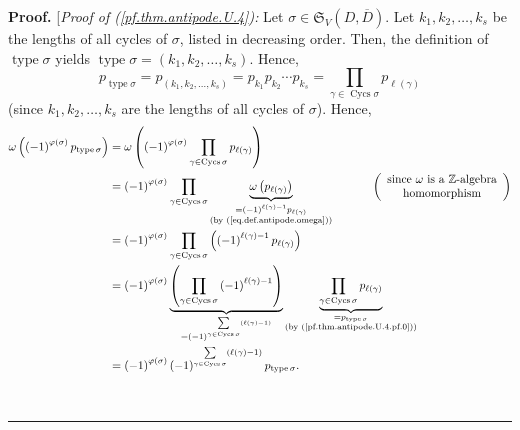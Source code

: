 \documentclass[numbers=enddot,12pt,final,onecolumn,notitlepage]{scrartcl}%
\numberwithin{exer}{section}
\theoremstyle{definition}
\newenvironment{proof}[1][Proof]{\noindent\textbf{#1.} }{\ \rule{0.5em}{0.5em}}
\let\sumnonlimits\sum
\let\prodnonlimits\prod
\renewcommand{\sum}{\sumnonlimits\limits}
\renewcommand{\prod}{\prodnonlimits\limits}
\begin{document}
\begin{proof}
[\textit{Proof of (\ref{pf.thm.antipode.U.4}):} Let $\sigma\in\mathfrak{S}%
_{V}\left(  D,\overline{D}\right)  $. Let $k_{1},k_{2},\ldots,k_{s}$ be the
lengths of all cycles of $\sigma$, listed in decreasing order. Then, the
definition of $\operatorname*{type}\sigma$ yields $\operatorname*{type}%
\sigma=\left(  k_{1},k_{2},\ldots,k_{s}\right)  $. Hence,
\begin{equation}
p_{\operatorname*{type}\sigma}=p_{\left(  k_{1},k_{2},\ldots,k_{s}\right)
}=p_{k_{1}}p_{k_{2}}\cdots p_{k_{s}}=\prod_{\gamma\in\operatorname*{Cycs}%
\sigma}p_{\ell\left(  \gamma\right)  } \label{pf.thm.antipode.U.4.pf.0}%
\end{equation}
(since $k_{1},k_{2},\ldots,k_{s}$ are the lengths of all cycles of $\sigma$).
Hence,%
\begin{align}
\omega\left(  \left(  -1\right)  ^{\varphi\left(  \sigma\right)
}p_{\operatorname*{type}\sigma}\right)   &  =\omega\left(  \left(  -1\right)
^{\varphi\left(  \sigma\right)  }\prod_{\gamma\in\operatorname*{Cycs}\sigma
}p_{\ell\left(  \gamma\right)  }\right) \nonumber\\
&  =\left(  -1\right)  ^{\varphi\left(  \sigma\right)  }\prod_{\gamma
\in\operatorname*{Cycs}\sigma}\underbrace{\omega\left(  p_{\ell\left(
\gamma\right)  }\right)  }_{\substack{=\left(  -1\right)  ^{\ell\left(
\gamma\right)  -1}p_{\ell\left(  \gamma\right)  }\\\text{(by
(\ref{eq.def.antipode.omega}))}}}\ \ \ \ \ \ \ \ \ \ \left(
\begin{array}
[c]{c}%
\text{since }\omega\text{ is a }\mathbb{Z}\text{-algebra}\\
\text{homomorphism}%
\end{array}
\right) \nonumber\\
&  =\left(  -1\right)  ^{\varphi\left(  \sigma\right)  }\prod_{\gamma
\in\operatorname*{Cycs}\sigma}\left(  \left(  -1\right)  ^{\ell\left(
\gamma\right)  -1}p_{\ell\left(  \gamma\right)  }\right) \nonumber\\
&  =\left(  -1\right)  ^{\varphi\left(  \sigma\right)  }\underbrace{\left(
\prod_{\gamma\in\operatorname*{Cycs}\sigma}\left(  -1\right)  ^{\ell\left(
\gamma\right)  -1}\right)  }_{=\left(  -1\right)  ^{\sum_{\gamma
\in\operatorname*{Cycs}\sigma}\left(  \ell\left(  \gamma\right)  -1\right)  }%
}\underbrace{\prod_{\gamma\in\operatorname*{Cycs}\sigma}p_{\ell\left(
\gamma\right)  }}_{\substack{=p_{\operatorname*{type}\sigma}\\\text{(by
(\ref{pf.thm.antipode.U.4.pf.0}))}}}\nonumber\\
&  =\left(  -1\right)  ^{\varphi\left(  \sigma\right)  }\left(  -1\right)
^{\sum_{\gamma\in\operatorname*{Cycs}\sigma}\left(  \ell\left(  \gamma\right)
-1\right)  }p_{\operatorname*{type}\sigma}. \label{pf.thm.antipode.U.4.pf.1}%
\end{align}



\end{proof}
\end{document}

